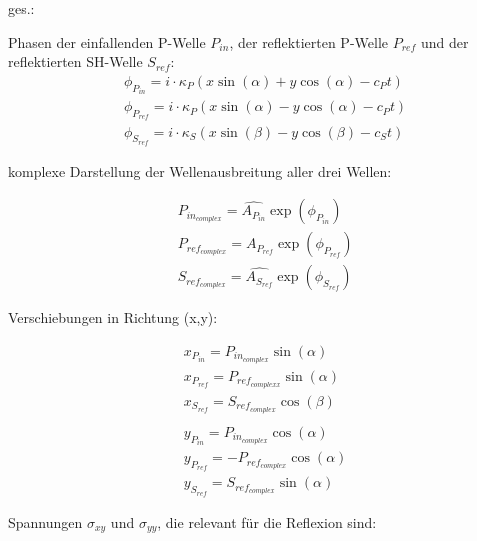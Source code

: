 \begin{minipage}[t]{.49\linewidth}
    ges.:
    \begin{tasks}

    \end{tasks}
\end{minipage}

\begin{solution}
    Phasen der einfallenden P-Welle $P_{in}$, der reflektierten P-Welle $P_{ref}$ und der reflektierten SH-Welle $S_{ref}$:
    \begin{align*}
            &\phi_{P_{in}} = \textit{i} \cdot \kappa_P (x \sin(\alpha) + y \cos(\alpha) - c_P t) \\
            &\phi_{P_{ref}} = \textit{i} \cdot \kappa_P (x \sin(\alpha) - y \cos(\alpha) - c_P t) \\
            &\phi_{S_{ref}} = \textit{i} \cdot \kappa_S (x \sin(\beta) - y \cos(\beta) - c_S t)
    \end{align*}

    komplexe Darstellung der Wellenausbreitung aller drei Wellen:

    \begin{align*}
        &P_{in_{complex}} = \hat{A_{P_{in}}} \exp(\phi_{P_{in}}) \\
        &P_{ref_{complex}} = \hat{A_{P_{ref}}} \exp(\phi_{P_{ref}}) \\
        &S_{ref_{complex}} = \hat{A_{S_{ref}}} \exp(\phi_{S_{ref}})
    \end{align*}

    Verschiebungen in Richtung (x,y):

    \begin{align*}
        &x_{P_{in}} = P_{in_{complex}} \sin(\alpha) \\
        &x_{P_{ref}} = P_{ref_{complexx}} \sin(\alpha) \\
        &x_{S_{ref}} = S_{ref_{complex}} \cos(\beta) \\
        \\
        &y_{P_{in}} = P_{in_{complex}} \cos(\alpha) \\
        &y_{P_{ref}} = - P_{ref_{complex}} \cos(\alpha) \\
        &y_{S_{ref}} = S_{ref_{complex}} \sin(\alpha)
    \end{align*}

    Spannungen $ \sigma_{xy}$ und $\sigma_{yy}$, die relevant für die Reflexion sind:


\end{solution}
